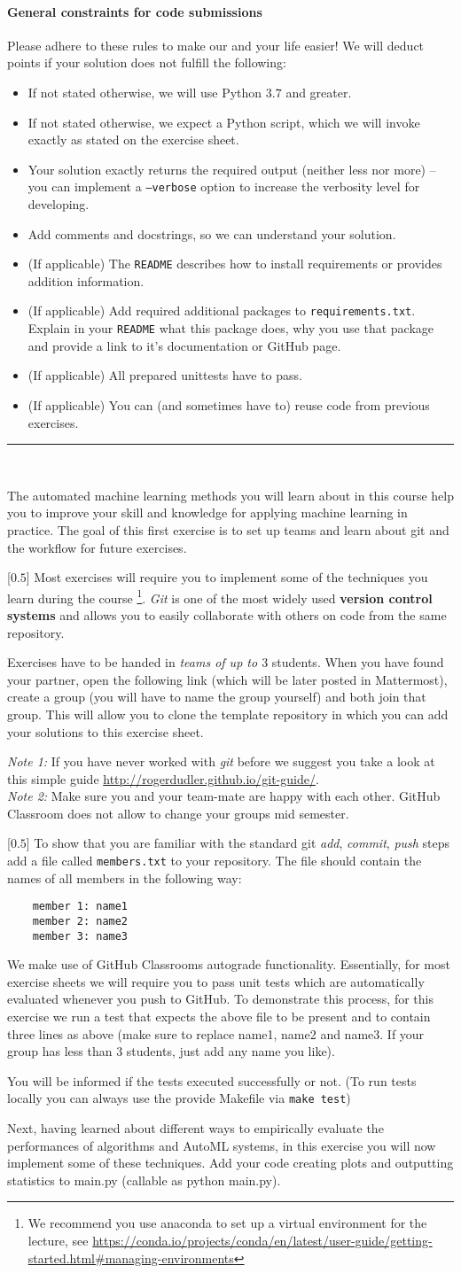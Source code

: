 \documentclass{exam}
\newcommand{\gccs}{\paragraph{General constraints for code submissions}
{
\footnotesize{
Please adhere to these rules to make our and your life easier! We will deduct points if your solution does not fulfill the following:
    
    \begin{itemize}
    	\item If not stated otherwise, we will use Python $3.7$ and greater.
        \item If not stated otherwise, we expect a Python script, which we will invoke exactly as stated on the exercise sheet.
        \item Your solution exactly returns the required output (neither less nor more) -- you can implement a \texttt{--verbose} option to increase the verbosity level for developing.
        \item Add comments and docstrings, so we can understand your solution.
        \item (If applicable) The \texttt{README} describes how to install requirements or provides addition information.
        \item (If applicable) Add required additional packages to \texttt{requirements.txt}. Explain in your \texttt{README} what this package does, why you use that package and provide a link to it's documentation or GitHub page.
        \item (If applicable) All prepared unittests have to pass.
        \item (If applicable) You can (and sometimes have to) reuse code from previous exercises.
    \end{itemize}
    \rule{\textwidth}{.5pt}
    \smallskip\\
    \noindent}}}
\begin{document}
	\gccs
The automated machine learning methods you will learn about in this course help you to improve your skill and knowledge for applying machine learning in practice. The goal of this first exercise is to set up teams and learn about git and the workflow for future exercises.\vspace*{5pt}
\begin{questions}
	 [$0.5$]
	Most exercises will require you to implement some of the techniques you learn during the course \footnote{We recommend you use anaconda to set up a virtual environment for the lecture, see \url{https://conda.io/projects/conda/en/latest/user-guide/getting-started.html\#managing-environments}}.
	\emph{Git} is one of the most widely used \textbf{version control systems} and allows you to easily collaborate with others on code from the same repository.
	
    Exercises have to be handed in \emph{teams of up to $3$} students.
    When you have found your partner, open the following link (which will be later posted in Mattermost), create a group (you will have to name the group yourself) and both join that group.
    This will allow you to clone the template repository in which you can add your solutions to this exercise sheet.

    \emph{Note 1:} If you have never worked with \emph{git} before we suggest you take a look at this simple guide \url{http://rogerdudler.github.io/git-guide/}.\\
    \emph{Note 2:} Make sure you and your team-mate are happy with each other. GitHub Classroom does not allow to change your groups mid semester.
	
     [$0.5$]
	To show that you are familiar with the standard git \emph{add}, \emph{commit}, \emph{push} steps add a file called \texttt{members.txt} to your repository.
	The file should contain the names of all members in the following way:
	\begin{verbatim}
	member 1: name1
	member 2: name2
	member 3: name3
	\end{verbatim}
	
	We make use of GitHub Classrooms autograde functionality. Essentially, for most exercise sheets we will require you to pass unit tests which are automatically evaluated whenever you push to GitHub.
	To demonstrate this process, for this exercise we run a test that expects the above file to be present and to contain three lines as above (make sure to replace name1, name2 and name3. If your group has less than 3 students, just add any name you like).

	You will be informed if the tests executed successfully or not.
	(To run tests locally you can always use the provide Makefile via \texttt{make test})
\end{questions}
	\bigskip
	Next, having learned about different ways to empirically evaluate the performances of algorithms and AutoML systems, in this exercise you will now implement some of these techniques. Add your code creating plots and outputting statistics to main.py (callable as python main.py).
	
\end{document}
